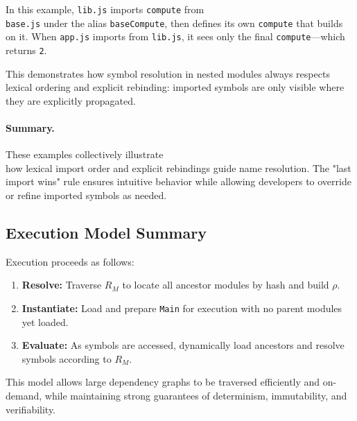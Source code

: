 \documentclass[sigplan,screen]{acmart}
\begin{document}
In this example, \texttt{lib.js} imports \texttt{compute} from \\\texttt{base.js} under the alias \texttt{baseCompute}, then defines its own \texttt{compute} that builds on it. When \texttt{app.js} imports from \texttt{lib.js}, it sees only the final \texttt{compute}—which returns \texttt{2}.

This demonstrates how symbol resolution in nested modules always respects lexical ordering and explicit rebinding: imported symbols are only visible where they are explicitly propagated.

\paragraph{Summary.}

These examples collectively illustrate \\how lexical import order and explicit rebindings guide name resolution. The "last import wins" rule ensures intuitive behavior while allowing developers to override or refine imported symbols as needed.

\subsection{Execution Model Summary}

Execution proceeds as follows:
\begin{enumerate}
	\item \textbf{Resolve:} Traverse $R_M$ to locate all ancestor modules by hash and build $\rho$.
	\item \textbf{Instantiate:} Load and prepare \texttt{Main} for execution with no parent modules yet loaded.
	\item \textbf{Evaluate:} As symbols are accessed, dynamically load ancestors and resolve symbols according to $R_M$.
\end{enumerate}

This model allows large dependency graphs to be traversed efficiently and on-demand, while maintaining strong guarantees of determinism, immutability, and verifiability.
\end{document}
